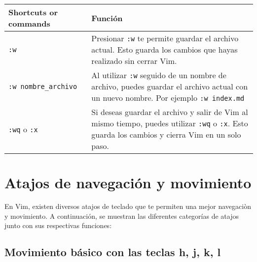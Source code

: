 \documentclass[
  doc,
  floatsintext,
  longtable,
  a4paper,
  nolmodern,
  notxfonts,
  notimes,
  colorlinks=true,linkcolor=blue,citecolor=blue,urlcolor=blue]{apa7}
\begin{document}
\begin{longtable}[]{@{}
  >{\raggedright\arraybackslash}p{}
  >{\raggedright\arraybackslash}p{}@{}}
\toprule\noalign{}
\begin{minipage}[b]{\linewidth}\raggedright
Shortcuts or commands
\end{minipage} & \begin{minipage}[b]{\linewidth}\raggedright
Función
\end{minipage} \\
\midrule\noalign{}
\endhead
\bottomrule\noalign{}
\endlastfoot
\texttt{:w} & Presionar \texttt{:w} te permite guardar el archivo
actual. Esto guarda los cambios que hayas realizado sin cerrar Vim. \\
\texttt{:w\ nombre\_archivo} & Al utilizar \texttt{:w} seguido de un
nombre de archivo, puedes guardar el archivo actual con un nuevo nombre.
Por ejemplo \texttt{:w\ index.md} \\
\texttt{:wq} o \texttt{:x} & Si deseas guardar el archivo y salir de Vim
al mismo tiempo, puedes utilizar \texttt{:wq} o \texttt{:x}. Esto guarda
los cambios y cierra Vim en un solo paso. \\
\end{longtable}

\section{Atajos de navegación y
movimiento}\label{atajos-de-navegaciuxf3n-y-movimiento}

En Vim, existen diversos atajos de teclado que te permiten una mejor
navegaciòn y movimiento. A continuación, se muestran las diferentes
categorías de atajos junto con sus respectivas funciones:

\subsection{Movimiento básico con las teclas h, j, k,
l}\label{movimiento-buxe1sico-con-las-teclas-h-j-k-l}
\end{document}
